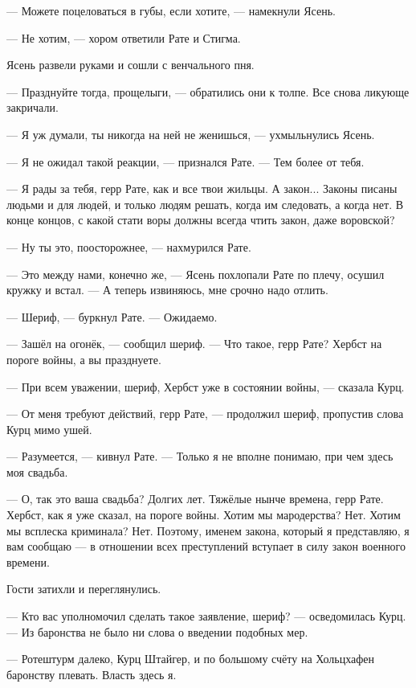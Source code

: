 --- Можете поцеловаться в губы, если хотите, --- намекнули Ясень.

--- Не хотим, --- хором ответили Рате и Стигма.

Ясень развели руками и сошли с венчального пня.

--- Празднуйте тогда, прощелыги, --- обратились они к толпе.
Все снова ликующе закричали.

\asterism

--- Я уж думали, ты никогда на ней не женишься, --- ухмыльнулись Ясень.

--- Я не ожидал такой реакции, --- признался Рате.
--- Тем более от тебя.

--- Я рады за тебя, герр Рате, как и все твои жильцы.
А закон...
Законы писаны людьми и для людей, и только людям решать, когда им следовать, а когда нет.
В конце концов, с какой стати воры должны всегда чтить закон, даже воровской?

--- Ну ты это, поосторожнее, --- нахмурился Рате.

--- Это между нами, конечно же, --- Ясень похлопали Рате по плечу, осушил кружку и встал.
--- А теперь извиняюсь, мне срочно надо отлить.

\asterism

--- Шериф, --- буркнул Рате.
--- Ожидаемо.

--- Зашёл на огонёк, --- сообщил шериф.
--- Что такое, герр Рате?
Хербст на пороге войны, а вы празднуете.

--- При всем уважении, шериф, Хербст уже в состоянии войны, --- сказала Курц.

--- От меня требуют действий, герр Рате, --- продолжил шериф, пропустив слова Курц мимо ушей.

--- Разумеется, --- кивнул Рате.
--- Только я не вполне понимаю, при чем здесь моя свадьба.

--- О, так это ваша свадьба?
Долгих лет.
Тяжёлые нынче времена, герр Рате.
Хербст, как я уже сказал, на пороге войны.
Хотим мы мародерства?
Нет.
Хотим мы всплеска криминала?
Нет.
Поэтому, именем закона, который я представляю, я вам сообщаю --- в отношении всех преступлений вступает в силу закон военного времени.

Гости затихли и переглянулись.

--- Кто вас уполномочил сделать такое заявление, шериф? --- осведомилась Курц.
--- Из баронства не было ни слова о введении подобных мер.

--- Ротештурм далеко, Курц Штайгер, и по большому счёту на Хольцхафен баронству плевать.
Власть здесь я.

